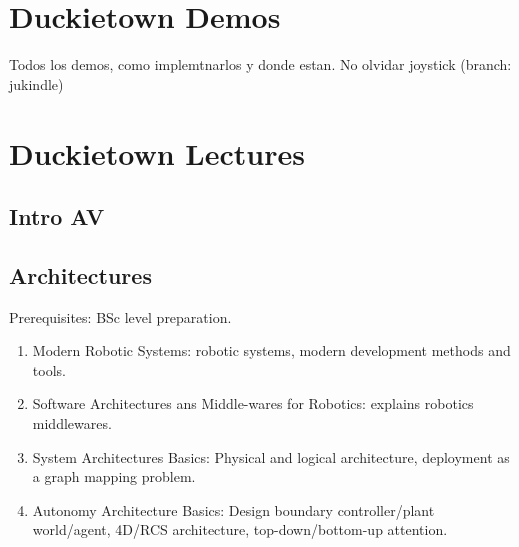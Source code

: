 \documentclass[12pt]{article}
\begin{document}

\section{Duckietown Demos}

Todos los demos, como implemtnarlos y donde estan. No olvidar joystick (branch: jukindle)





\section{Duckietown Lectures}

\subsection{Intro AV}


\subsection{Architectures}

Prerequisites: BSc level preparation.

\begin{enumerate}

	\item Modern Robotic Systems: robotic systems, modern development methods and tools.
	\item Software Architectures ans Middle-wares for Robotics: explains robotics middlewares.
	\item System Architectures Basics: Physical and logical architecture, deployment as a graph mapping problem. 
	\item Autonomy Architecture Basics: Design boundary controller/plant world/agent, 4D/RCS architecture, top-down/bottom-up attention.

\end{enumerate}
\end{document}
